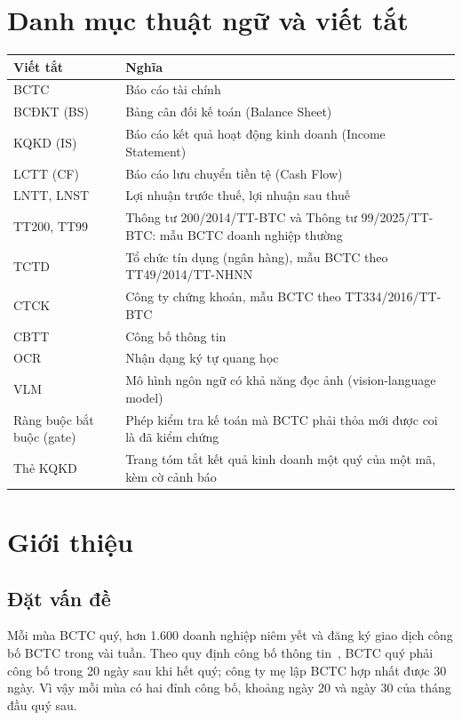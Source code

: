 \documentclass[12pt,a4paper]{report}
\begin{document}
\chapter*{Danh mục thuật ngữ và viết tắt}
\begin{tabularx}{\linewidth}{@{}lX@{}}
\toprule
\textbf{Viết tắt} & \textbf{Nghĩa} \\ \midrule
BCTC & Báo cáo tài chính \\
BCĐKT (BS) & Bảng cân đối kế toán (Balance Sheet) \\
KQKD (IS) & Báo cáo kết quả hoạt động kinh doanh (Income Statement) \\
LCTT (CF) & Báo cáo lưu chuyển tiền tệ (Cash Flow) \\
LNTT, LNST & Lợi nhuận trước thuế, lợi nhuận sau thuế \\
TT200, TT99 & Thông tư 200/2014/TT-BTC và Thông tư 99/2025/TT-BTC: mẫu BCTC doanh nghiệp thường \\
TCTD & Tổ chức tín dụng (ngân hàng), mẫu BCTC theo TT49/2014/TT-NHNN \\
CTCK & Công ty chứng khoán, mẫu BCTC theo TT334/2016/TT-BTC \\
CBTT & Công bố thông tin \\
OCR & Nhận dạng ký tự quang học \\
VLM & Mô hình ngôn ngữ có khả năng đọc ảnh (vision-language model) \\
Ràng buộc bắt buộc (gate) & Phép kiểm tra kế toán mà BCTC phải thỏa mới được coi là đã kiểm chứng \\
Thẻ KQKD & Trang tóm tắt kết quả kinh doanh một quý của một mã, kèm cờ cảnh báo \\
\bottomrule
\end{tabularx}

\newpage
{}

\chapter{Giới thiệu}

\section{Đặt vấn đề}
Mỗi mùa BCTC quý, hơn 1.600 doanh nghiệp niêm yết và đăng ký giao dịch công bố BCTC trong vài tuần. Theo quy định công bố
thông tin~\cite{tt96}, BCTC quý phải công bố trong 20 ngày sau khi hết quý; công ty mẹ lập BCTC hợp nhất được 30 ngày.
Vì vậy mỗi mùa có hai đỉnh công bố, khoảng ngày 20 và ngày 30 của tháng đầu quý sau.
\end{document}
